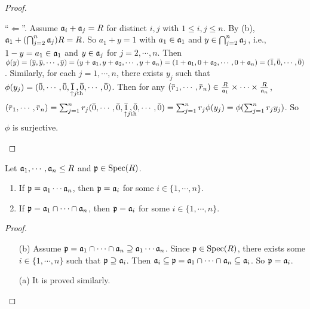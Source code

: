 \begin{proof}
\begin{enumerate}
            ``$\Leftarrow$''. Assume $\mathfrak{a}_i + \mathfrak{a}_j = R$ for distinct $i,j$ with $1 \leq i,j \leq n$. By (b), $\mathfrak{a}_1 + (\bigcap_{j=2}^n \mathfrak{a}_j)R = R$. So $a_1 + y = 1$ with $a_1 \in \mathfrak{a}_1$ and $y \in \bigcap_{j=2}^n \mathfrak{a}_j$, i.e., $1-y = a_1 \in \mathfrak{a}_1$ and $y \in \mathfrak{a}_j$ for $j = 2,\cdots, n$. Then $\phi(y) = (\overbar y, \overbar y, \cdots, \overbar y) = (y + \ffa_1, y + \ffa_2, \cdots, y + \ffa_n) = (1+\ffa_1,0+\ffa_2,\cdots,0+\ffa_n) = (\overbar 1,\overbar 0, \cdots, \overbar 0)$. Similarly, for each $j = 1,\cdots,n$, there exists $y_j$ such that $\phi(y_j) = (\overbar 0, \cdots, \overbar 0, \mathpunct{\underset{\mathclap{\substack{\ \ \ \uparrow j\text{th}\\ \textstyle }}}{\overbar 1}}, \overbar 0, \cdots, \overbar 0)$. Then for any $(\overbar r_1,\cdots, \overbar r_n) \in \frac{R}{\ffa_1} \times \cdots \times \frac{R}{\ffa_n}$, $(\overbar r_1,\cdots, \overbar r_n) = \sum_{j=1}^n r_j(\overbar 0, \cdots, \overbar 0, \mathpunct{\underset{\mathclap{\substack{\ \ \ \uparrow j\text{th} \\ \textstyle }}}{\overbar 1}}, \overbar 0, \cdots, \overbar 0) = \sum_{j=1}^n r_j\phi(y_j) = \phi(\sum_{j=1}^nr_jy_j)$. So $\phi$ is surjective. \qedhere
    \end{enumerate}
\end{proof}

\begin{proposition}
    Let $\mathfrak{a}_1,\cdots,\mathfrak{a}_n \leq R$ and $\mathfrak{p} \in \operatorname{Spec}(R)$.
    \begin{enumerate}
        \item If $\mathfrak{p} = \mathfrak{a}_1 \cdots \mathfrak{a}_n$, then $\mathfrak{p} = \mathfrak{a}_i$ for some $i \in \{1,\cdots,n\}$.
        \item If $\mathfrak{p} = \mathfrak{a}_1 \cap \cdots \cap \mathfrak{a}_n$, then $\mathfrak{p} = \mathfrak{a}_i$ for some $i \in \{1,\cdots,n\}$.
    \end{enumerate}
\end{proposition}

\begin{proof}
    \begin{enumerate}
        \item [(b)] Assume $\mathfrak{p} = \mathfrak{a}_1 \cap \cdots \cap \mathfrak{a}_n \supseteq \mathfrak{a}_1 \cdots \mathfrak{a}_n$. Since $\mathfrak{p} \in \operatorname{Spec}(R)$, there exists some $i \in \{1,\cdots,n\}$ such that $\mathfrak{p} \supseteq \mathfrak{a}_i$. Then $\mathfrak{a}_i \subseteq \mathfrak{p} = \mathfrak{a}_1 \cap \cdots \cap \mathfrak{a}_n \subseteq \mathfrak{a}_i$. So $\mathfrak{p} = \mathfrak{a}_i$. 
        \item[(a)] It is proved similarly. \qedhere
    \end{enumerate}
\end{proof}

